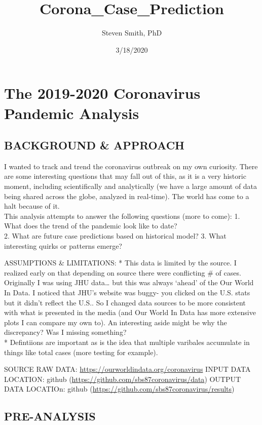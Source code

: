 \documentclass[]{article}
\title{Corona\_Case\_Prediction}
\author{Steven Smith, PhD}
\date{3/18/2020}
\begin{document}
\maketitle

{
\setcounter{tocdepth}{2}
\tableofcontents
}
\section{The 2019-2020 Coronavirus Pandemic
Analysis}\label{the-2019-2020-coronavirus-pandemic-analysis}

\subsection{BACKGROUND \& APPROACH}\label{background-approach}

I wanted to track and trend the coronavirus outbreak on my own
curiosity. There are some interesting questions that may fall out of
this, as it is a very historic moment, including scientifically and
analytically (we have a large amount of data being shared across the
globe, analyzed in real-time). The world has come to a halt because of
it.\\
This analysis attempts to answer the following questions (more to come):
1. What does the trend of the pandemic look like to date?\\
2. What are future case predictions based on historical model? 3. What
interesting quirks or patterns emerge?

ASSUMPTIONS \& LIMITATIONS: * This data is limited by the source. I
realized early on that depending on source there were conflicting \# of
cases. Originally I was using JHU data\ldots{} but this was always
`ahead' of the Our World In Data. I noticed that JHU's website was
buggy- you clicked on the U.S. stats but it didn't reflect the U.S.. So
I changed data sources to be more consistent with what is presented in
the media (and Our World In Data has more extensive plots I can compare
my own to). An interesting aside might be why the discrepancy? Was I
missing something?\\
* Defintiions are important as is the idea that multiple varibales
accumulate in things like total cases (more testing for example).

SOURCE RAW DATA: \url{https://ourworldindata.org/coronavirus} INPUT DATA
LOCATION: github (\url{https://github.com/sbs87coronavirus/data}) OUTPUT
DATA LOCATIOn: github
(\url{https://github.com/sbs87coronavirus/results})

\subsection{PRE-ANALYSIS}\label{pre-analysis}
\end{document}
